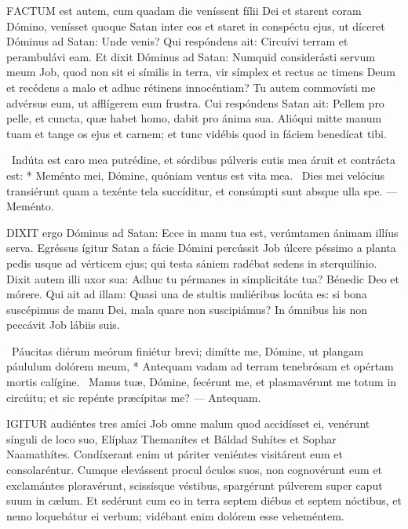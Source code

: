 


\lettrine[lines=2]{F}{ACTUM} est autem, cum quadam die veníssent fílii Dei et starent coram Dómino, venísset quoque Satan inter eos et staret in conspéctu ejus, ut díceret Dóminus ad Satan: Unde venis? Qui respóndens ait: Circuívi terram et perambulávi eam. Et dixit Dóminus ad Satan: Numquid considerásti servum meum Job, quod non sit ei símilis in terra, vir símplex et rectus ac timens Deum et recédens a malo et adhuc rétinens innocéntiam? Tu autem commovísti me advérsus eum, ut afflígerem eum frustra. Cui respóndens Satan ait: Pellem pro pelle, et cuncta, quæ habet homo, dabit pro ánima sua. Alióqui mitte manum tuam et tange os ejus et carnem; et tunc vidébis quod in fáciem benedícat tibi.

\R\ Indúta est caro mea putrédine, et sórdibus púlveris cutis mea áruit et contrácta est: * Meménto mei, Dómine, quóniam ventus est vita mea. \V\ Dies mei velócius transiérunt quam a texénte tela succíditur, et consúmpti sunt absque ulla spe. — Meménto.


\lettrine[lines=2]{D}{IXIT} ergo Dóminus ad Satan: Ecce in manu tua est, verúmtamen ánimam illíus serva. Egréssus ígitur Satan a fácie Dómini percússit Job úlcere péssimo a planta pedis usque ad vérticem ejus; qui testa sániem radébat sedens in sterquilínio. Dixit autem illi uxor sua: Adhuc tu pérmanes in simplicitáte tua? Bénedic Deo et mórere. Qui ait ad illam: Quasi una de stultis muliéribus locúta es: si bona suscépimus de manu Dei, mala quare non suscipiámus? In ómnibus his non peccávit Job lábiis suis.

\R\ Páucitas diérum meórum finiétur brevi; dimítte me, Dómine, ut plangam páululum dolórem meum, * Antequam vadam ad terram tenebrósam et opértam mortis calígine. \V\ Manus tuæ, Dómine, fecérunt me, et plasmavérunt me totum in circúitu; et sic repénte præcípitas me? — Antequam.



\lettrine[lines=2]{I}{GITUR} audiéntes tres amíci Job omne malum quod accidísset ei, venérunt sínguli de loco suo, Elíphaz Themanítes et Báldad Suhítes et Sophar Naamathítes. Condíxerant enim ut páriter veniéntes visitárent eum et consolaréntur. Cumque elevássent procul óculos suos, non cognovérunt eum et exclamántes ploravérunt, scissísque véstibus, spargérunt púlverem super caput suum in cælum. Et sedérunt cum eo in terra septem diébus et septem nóctibus, et nemo loquebátur ei verbum; vidébant enim dolórem esse veheméntem.

